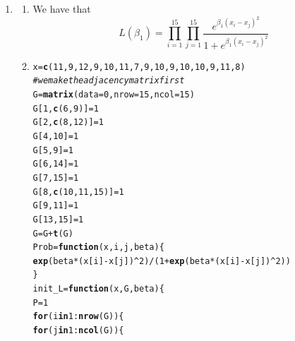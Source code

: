 \documentclass[12pt,english]{article}\usepackage[]{graphicx}\usepackage[]{xcolor}
\makeatletter
\newcommand{\hlnum}[1]{\textcolor[rgb]{0.686,0.059,0.569}{#1}}%
\newcommand{\hlcom}[1]{\textcolor[rgb]{0.678,0.584,0.686}{\textit{#1}}}%
\newcommand{\hlopt}[1]{\textcolor[rgb]{0,0,0}{#1}}%
\newcommand{\hldef}[1]{\textcolor[rgb]{0.345,0.345,0.345}{#1}}%
\newcommand{\hlkwa}[1]{\textcolor[rgb]{0.161,0.373,0.58}{\textbf{#1}}}%
\newcommand{\hlkwb}[1]{\textcolor[rgb]{0.69,0.353,0.396}{#1}}%
\newcommand{\hlkwc}[1]{\textcolor[rgb]{0.333,0.667,0.333}{#1}}%
\newcommand{\hlkwd}[1]{\textcolor[rgb]{0.737,0.353,0.396}{\textbf{#1}}}%
\newenvironment{kframe}{%
 \def\at@end@of@kframe{}%
 \ifinner\ifhmode%
  \def\at@end@of@kframe{\end{minipage}}%
  \begin{minipage}{\columnwidth}%
 \fi\fi%
 \def\FrameCommand##1{\hskip\@totalleftmargin \hskip-\fboxsep
 \colorbox{shadecolor}{##1}\hskip-\fboxsep
     \hskip-\linewidth \hskip-\@totalleftmargin \hskip\columnwidth}%
 \MakeFramed {\advance\hsize-\width
   \@totalleftmargin\z@ \linewidth\hsize
   \@setminipage}}%
 {\par\unskip\endMakeFramed%
 \at@end@of@kframe}
\newenvironment{knitrout}{}{} %
\makeatother
\begin{document}
\begin{enumerate}[label=\arabic*.]
\item \begin{enumerate}[label=(\alph*)]
		\item We have that 
			\[
				L(\beta_1)=\prod_{i=1}^{15}\prod_{j=1}^{15} \frac{e^{\beta_1(x_i-x_j)^2}}{1+e^{\beta_1(x_i-x_j)^2}}
			\]
		\item 
\begin{knitrout}
\color{fgcolor}\begin{kframe}
\begin{alltt}
\hldef{x} \hlkwb{=} \hlkwd{c}\hldef{(}\hlnum{11}\hldef{,}\hlnum{9}\hldef{,}\hlnum{12}\hldef{,}\hlnum{9}\hldef{,}\hlnum{10}\hldef{,}\hlnum{11}\hldef{,}\hlnum{7}\hldef{,}\hlnum{9}\hldef{,}\hlnum{10}\hldef{,}\hlnum{9}\hldef{,}\hlnum{10}\hldef{,}\hlnum{10}\hldef{,}\hlnum{9}\hldef{,}\hlnum{11}\hldef{,}\hlnum{8}\hldef{)}
\hlcom{# we make the adjacency matrix first}
\hldef{G} \hlkwb{=} \hlkwd{matrix}\hldef{(}\hlkwc{data}\hldef{=}\hlnum{0}\hldef{,}\hlkwc{nrow}\hldef{=}\hlnum{15}\hldef{,}\hlkwc{ncol}\hldef{=}\hlnum{15}\hldef{)}
\hldef{G[}\hlnum{1}\hldef{,}\hlkwd{c}\hldef{(}\hlnum{6}\hldef{,}\hlnum{9}\hldef{)]}\hlkwb{=}\hlnum{1}
\hldef{G[}\hlnum{2}\hldef{,}\hlkwd{c}\hldef{(}\hlnum{8}\hldef{,}\hlnum{12}\hldef{)]}\hlkwb{=}\hlnum{1}
\hldef{G[}\hlnum{4}\hldef{,}\hlnum{10}\hldef{]}\hlkwb{=}\hlnum{1}
\hldef{G[}\hlnum{5}\hldef{,}\hlnum{9}\hldef{]}\hlkwb{=}\hlnum{1}
\hldef{G[}\hlnum{6}\hldef{,}\hlnum{14}\hldef{]}\hlkwb{=}\hlnum{1}
\hldef{G[}\hlnum{7}\hldef{,}\hlnum{15}\hldef{]}\hlkwb{=}\hlnum{1}
\hldef{G[}\hlnum{8}\hldef{,}\hlkwd{c}\hldef{(}\hlnum{10}\hldef{,}\hlnum{11}\hldef{,}\hlnum{15}\hldef{)]}\hlkwb{=}\hlnum{1}
\hldef{G[}\hlnum{9}\hldef{,}\hlnum{11}\hldef{]}\hlkwb{=}\hlnum{1}
\hldef{G[}\hlnum{13}\hldef{,}\hlnum{15}\hldef{]}\hlkwb{=}\hlnum{1}
\hldef{G} \hlkwb{=} \hldef{G} \hlopt{+} \hlkwd{t}\hldef{(G)}
\hldef{Prob} \hlkwb{=} \hlkwa{function}\hldef{(}\hlkwc{x}\hldef{,}\hlkwc{i}\hldef{,}\hlkwc{j}\hldef{,}\hlkwc{beta}\hldef{) \{}
\hlkwd{exp}\hldef{(beta}\hlopt{*}\hldef{(x[i]}\hlopt{-}\hldef{x[j])}\hlopt{^}\hlnum{2}\hldef{)}\hlopt{/}\hldef{(}\hlnum{1}\hlopt{+}\hlkwd{exp}\hldef{(beta}\hlopt{*}\hldef{(x[i]}\hlopt{-}\hldef{x[j])}\hlopt{^}\hlnum{2}\hldef{))}
\hldef{\}}
\hldef{init_L} \hlkwb{=} \hlkwa{function}\hldef{(}\hlkwc{x}\hldef{,}\hlkwc{G}\hldef{,}\hlkwc{beta}\hldef{) \{}
        \hldef{P} \hlkwb{=} \hlnum{1}
        \hlkwa{for}\hldef{(i} \hlkwa{in} \hlnum{1}\hlopt{:}\hlkwd{nrow}\hldef{(G)) \{}
                \hlkwa{for}\hldef{(j} \hlkwa{in} \hlnum{1}\hlopt{:}\hlkwd{ncol}\hldef{(G)) \{}

\end{alltt}
\end{kframe}
\end{knitrout}
\end{enumerate}
\end{enumerate}
\end{document}
